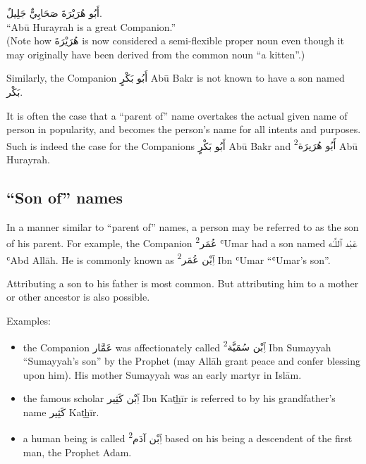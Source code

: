 \documentclass[
  10pt,
]{book}
\providecommand{\tightlist}{%
  \setlength{\itemsep}{0pt}\setlength{\parskip}{0pt}}
\begin{document}
\foreignlanguage{arabic}{أَبُو هُرَيْرَةَ صَحَابِيٌّ جَلِيلٌ.}\\
\enquote{Abū Hurayrah is a great Companion.}\\
(Note how \foreignlanguage{arabic}{هُرَيْرَةَ} is now considered a semi-flexible proper noun even though it may originally have been derived from the common noun \enquote{a kitten}.)

Similarly, the Companion \foreignlanguage{arabic}{أَبُو بَکْرٍ} Abū Bakr is not known to have a son named \foreignlanguage{arabic}{بَکْر}.

It is often the case that a \enquote{parent of} name overtakes the actual given name of person in popularity, and becomes the person's name for all intents and purposes. Such is indeed the case for the Companions
\foreignlanguage{arabic}{أَبُو بَکْرٍ} Abū Bakr
and
\foreignlanguage{arabic}{أَبُو هُرَيرَة\textsuperscript{2}}
Abū Hurayrah.

\subsection{\texorpdfstring{\enquote{Son of} names}{``Son of'' names}}\label{son-of-names}

In a manner similar to \enquote{parent of} names, a person may be referred to as the son of his parent. For example, the Companion \foreignlanguage{arabic}{عُمَر\textsuperscript{2}} ʿUmar had a son named
\foreignlanguage{arabic}{عَبْد ٱللَّـٰه} ʿAbd Allāh. He is commonly known as \foreignlanguage{arabic}{ٱِبْن عُمَر\textsuperscript{2}} Ibn ʿUmar \enquote{ʿUmar's son}.

Attributing a son to his father is most common. But attributing him to a mother or other ancestor is also possible.

Examples:

\begin{itemize}
\tightlist
\item
  the Companion \foreignlanguage{arabic}{عَمَّار} was affectionately called \foreignlanguage{arabic}{ٱِبْن سُمَيَّة\textsuperscript{2}} Ibn Sumayyah \enquote{Sumayyah's son} by the Prophet
  (may Allāh grant peace and confer blessing upon him). His mother Sumayyah was an early martyr in Islām.
\item
  the famous scholar \foreignlanguage{arabic}{ٱِبْن کَثِير} Ibn Kat͟hīr is referred to by his grandfather's name \foreignlanguage{arabic}{کَثِير} Kat͟hīr.
\item
  a human being is called \foreignlanguage{arabic}{ٱِبْن آدَم\textsuperscript{2}} based on his being a descendent of the first man, the Prophet Adam.
\end{itemize}
\end{document}
